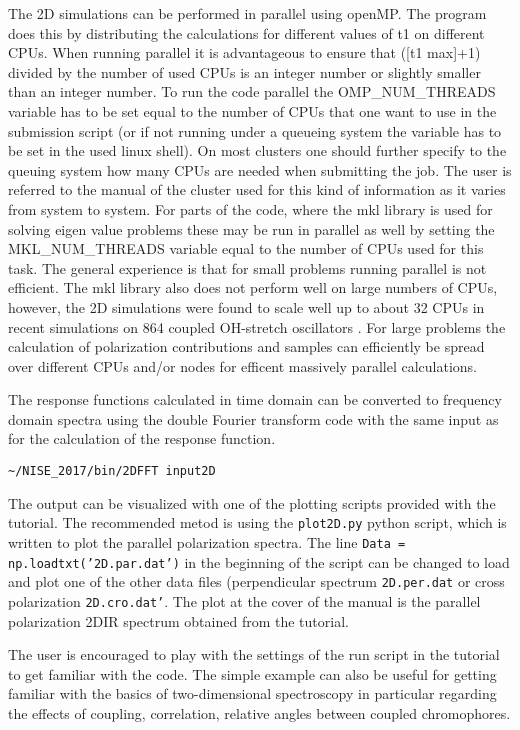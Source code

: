 The 2D simulations can be performed in parallel using openMP. The program does this by distributing the calculations for different values of t1 on different CPUs. When running parallel it is advantageous to ensure that ([t1 max]+1) divided by the number of used CPUs is an integer number or slightly smaller than an integer number. To run the code parallel the OMP\_NUM\_THREADS variable has to be set equal to the number of CPUs that one want to use in the submission script (or if not running under a queueing system the variable has to be set in the used linux shell). On most clusters one should further specify to the queuing system how many CPUs are needed when submitting the job. The user is referred to the manual of the cluster used for this kind of information as it varies from system to system. For parts of the code, where the mkl library is used for solving eigen value problems these may be run in parallel as well by setting the MKL\_NUM\_THREADS variable equal to the number of CPUs used for this task. The general experience is that for small problems running parallel is not efficient. The mkl library also does not perform well on large numbers of CPUs, however, the 2D simulations were found to scale well up to about 32 CPUs in recent simulations on 864 coupled OH-stretch oscillators \cite{Shi.2016.PCCP}. For large problems the calculation of polarization contributions and samples can efficiently be spread over different CPUs and/or nodes for efficent massively parallel calculations.

The response functions calculated in time domain can be converted to frequency domain spectra using the double Fourier transform code with the same input as for the calculation of the response function.
\begin{verbatim}
~/NISE_2017/bin/2DFFT input2D
\end{verbatim}
The output can be visualized with one of the plotting scripts provided with the tutorial. The recommended metod is using the {\tt plot2D.py} python script, which is written to plot the parallel polarization spectra. The line {\tt Data = np.loadtxt('2D.par.dat')} in the beginning of the script can be changed to load and plot one of the other data files (perpendicular spectrum {\tt 2D.per.dat} or cross polarization {\tt 2D.cro.dat'}. The plot at the cover of the manual is the parallel polarization 2DIR spectrum obtained from the tutorial.

The user is encouraged to play with the settings of the run script in the tutorial to get familiar with the code.
The simple example can also be useful for getting familiar with the basics of two-dimensional spectroscopy in particular regarding the effects of coupling, correlation, relative angles between
coupled chromophores.

